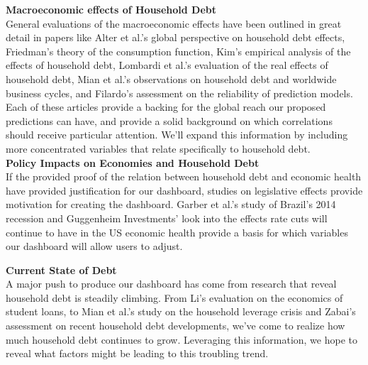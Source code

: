 \documentclass[sigconf,nonacm,11pt]{acmart}
\begin{document}
\textbf{Macroeconomic effects of Household Debt}\\
General evaluations of the macroeconomic effects have been outlined in great detail in papers like Alter et al.'s global perspective on household debt effects\cite{Alter2018}, Friedman's theory of the consumption function\cite{Friedman1957}, Kim's empirical analysis of the effects of household debt\cite{Kim2016}, Lombardi et al.'s evaluation of the real effects of household debt\cite{Lombardi2017}, Mian et al.'s observations on household debt and worldwide business cycles\cite{Mian2015}\cite{Mian2018}, and Filardo's assessment on  the reliability of prediction models\cite{Filardo1999}. Each of these articles provide a backing for the global reach our proposed predictions can have, and provide a solid background on which correlations should receive particular attention. We'll expand this information by including more concentrated variables that relate specifically to household debt.\\

\vspace{0.25em}
\textbf{Policy Impacts on Economies and Household Debt}\\
If the provided proof of the relation between household debt and economic health have provided justification for our dashboard, studies on legislative effects provide motivation for creating the dashboard.  Garber et al.'s study of Brazil's 2014 recession\cite{Garber2018} and Guggenheim Investments' look into the effects rate cuts will continue to have in the US economic health\cite{Guggenheim2019} provide a basis for which variables our dashboard will allow users to adjust.\\
\vspace{0.5em}

\textbf{Current State of Debt}\\
A major push to produce our dashboard has come from research that reveal household debt is steadily climbing.  From Li's evaluation on the economics of student loans\cite{Li2013}, to Mian et al.'s study on the household leverage crisis\cite{Mian2011} and Zabai's assessment on recent household debt developments\cite{Zabai2017}, we've come to realize how much household debt continues to grow.  Leveraging this information, we hope to reveal what factors might be leading to this troubling trend.

\end{document}
